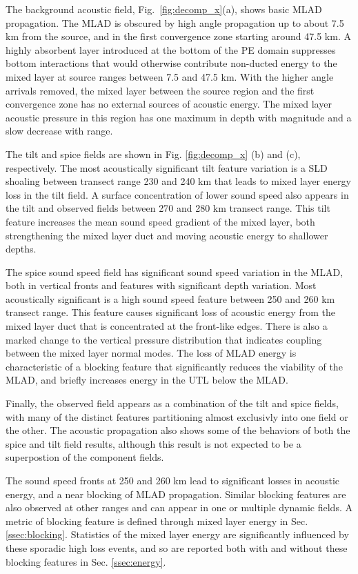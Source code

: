 \documentclass[preprint,NumberedRefs]{JASA}
\begin{document}
The background acoustic field, Fig.~\ref{fig:decomp_x}(a), shows basic MLAD propagation. The MLAD is obscured by high angle propagation up to about 7.5 km from the source, and in the first convergence zone starting around 47.5 km. A highly absorbent layer introduced at the bottom of the PE domain suppresses bottom interactions that would otherwise contribute non-ducted energy to the mixed layer at source ranges between 7.5 and 47.5 km. With the higher angle arrivals removed, the mixed layer between the source region and the first convergence zone has no external sources of acoustic energy. The mixed layer acoustic pressure in this region has one maximum in depth with magnitude and a slow decrease with range.

The tilt and spice fields are shown in Fig. \ref{fig:decomp_x} (b) and (c), respectively. The most acoustically significant tilt feature variation is a SLD shoaling between transect range 230 and 240 km that leads to mixed layer energy loss in the tilt field. A surface concentration of lower sound speed also appears in the tilt and observed fields between 270 and 280 km transect range. This tilt feature increases the mean sound speed gradient of the mixed layer, both strengthening the mixed layer duct and moving acoustic energy to shallower depths.

The spice sound speed field has significant sound speed variation in the MLAD, both in vertical fronts and features with significant depth variation. Most acoustically significant is a high sound speed feature between 250 and 260 km transect range. This feature causes significant loss of acoustic energy from the mixed layer duct that is concentrated at the front-like edges. There is also a marked change to the vertical pressure distribution that indicates coupling between the mixed layer normal modes. The loss of MLAD energy is characteristic of a blocking feature that significantly reduces the viability of the MLAD, and briefly increases energy in the UTL below the MLAD.

Finally, the observed field appears as a combination of the tilt and spice fields, with many of the distinct features partitioning almost exclusivly into one field or the other. The acoustic propagation also shows some of the behaviors of both the spice and tilt field results, although this result is not expected to be a superpostion of the component fields.

The sound speed fronts at 250 and 260 km lead to significant losses in acoustic energy, and a near blocking of MLAD propagation. Similar blocking features are also observed at other ranges and can appear in one or multiple dynamic fields. A metric of blocking feature is defined through mixed layer energy in Sec. \ref{ssec:blocking}. Statistics of the mixed layer energy are significantly influenced by these sporadic high loss events, and so are reported both with and without these blocking features in Sec. \ref{ssec:energy}.
\end{document}
